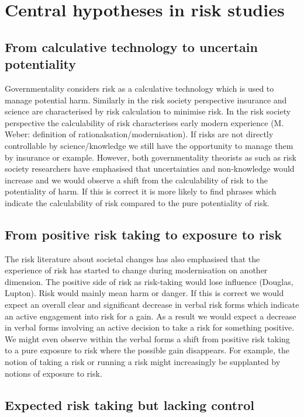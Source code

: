 \documentclass{report}
\begin{document}
\section{Central hypotheses in risk studies}

\subsection*{From calculative technology to uncertain potentiality}

Governmentality considers risk as a calculative technology which is used to manage potential harm. Similarly in the risk society perspective insurance and science are characterised by risk calculation to minimise risk. In the risk society perspective the calculability of risk characterises early modern experience (M. Weber: definition of rationalsation\slash modernisation). If risks are not directly controllable by science\slash knowledge we still have the opportunity to manage them by insurance or example. However, both governmentality theorists as such as risk society researchers have emphasised that uncertainties and non-knowledge would increase and we would observe a shift from the calculability of risk to the potentiality of harm. If this is correct it is more likely to find phrases which indicate the calculability of risk compared to the pure potentiality of risk. 

\subsection*{From positive risk taking to exposure to risk}

The risk literature about societal changes has also emphasised that the experience of risk has started to change during modernisation on another dimension. The positive side of risk as risk-taking would lose influence (Douglas, Lupton). Risk would mainly mean harm or danger. If this is correct we would expect an overall clear and significant decrease in verbal risk forms which indicate an active engagement into risk for a gain. As a result we would expect a decrease in verbal forms involving an active decision to take a risk for something positive. We might even observe within the verbal forms a shift from positive risk taking to a pure exposure to risk where the possible gain disappears. For example, the notion of taking a risk or running a risk might increasingly be supplanted by notions of exposure to risk.

\subsection*{Expected risk taking but lacking control}
\end{document}
